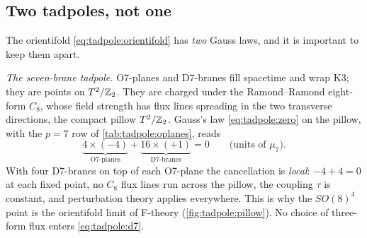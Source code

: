 \subsection{Two tadpoles, not one}
The orientifold \eqref{eq:tadpole:orientifold} has \emph{two} Gauss laws, and it is important
to keep them apart.

\emph{The seven-brane tadpole.} O7-planes and D7-branes fill spacetime and wrap K3; they are
points on $T^2/\mathbb{Z}_2$. They are charged under the Ramond--Ramond eight-form $C_8$, whose
field strength has flux lines spreading in the two transverse directions, the compact
pillow $T^2/\mathbb{Z}_2$. Gauss's law \eqref{eq:tadpole:zero} on the pillow, with the $p=7$ row
of \cref{tab:tadpole:oplanes}, reads
\begin{equation}\label{eq:tadpole:d7}
 \underbrace{4\times(-4)}_{\text{O7-planes}}+\underbrace{16\times(+1)}_{\text{D7-branes}}=0
 \qquad\text{(units of }\mu_7\text{)} .
\end{equation}
With four D7-branes on top of each O7-plane the cancellation is \emph{local}:
$-4+4=0$ at each fixed point, no $C_8$ flux lines run across the pillow, the coupling
$\tau$ is constant, and perturbation theory applies everywhere. This is why the $SO(8)^4$
point is the orientifold limit of F-theory (\cref{fig:tadpole:pillow}). No choice of
three-form flux enters \eqref{eq:tadpole:d7}.

